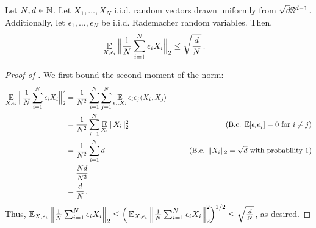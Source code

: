 \begin{lemma} \label{lemma:sign_times_gaussian_vector}
Let $N, d \in \mathbb{N}$. Let $X_1, \ldots, X_N$ i.i.d. random vectors drawn uniformly from $\sqrt{d} \mathbb{S}^{d - 1}$. Additionally, let $\epsilon_1, \ldots, \epsilon_N$ be i.i.d. Rademacher random variables. Then,
\begin{align}
\operatorname*{\mathbb{E}}_{X, \epsilon_i} \Big\| \frac{1}{N} \sum_{i = 1}^N \epsilon_i X_i \Big\|_2
& \leq \sqrt{\frac{d}{N}} \,.
\end{align}
\end{lemma}
\begin{proof}[Proof of ]
We first bound the second moment of the norm:
\begin{align}
\E_{X, \epsilon_i} \Big\|\frac{1}{N} \sum_{i = 1}^N \epsilon_i X_i \Big\|_2^2
& = \frac{1}{N^2} \sum_{i = 1}^N \sum_{j = 1}^N \E_{\epsilon_i, X_i} \epsilon_i \epsilon_j \langle X_i, X_j \rangle \\
& = \frac{1}{N^2} \sum_{i = 1}^N \E_{X_i} \|X_i\|_2^2 
& \tag{B.c. $\E[\epsilon_i \epsilon_j] = 0$ for $i \neq j$} \\
& = \frac{1}{N^2} \sum_{i = 1}^N d
& \tag{B.c. $\|X_i\|_2 = \sqrt{d}$ with probability $1$} \\
& = \frac{Nd}{N^2} \\
& = \frac{d}{N} \period
\end{align}
Thus, $\operatorname*{\mathbb{E}}_{X, \epsilon_i} \Big\| \frac{1}{N} \sum_{i = 1}^N \epsilon_i X_i \Big\|_2 \leq \Big(\operatorname*{\mathbb{E}}_{X, \epsilon_i} \Big\| \frac{1}{N} \sum_{i = 1}^N \epsilon_i X_i \Big\|_2^2 \Big)^{1/2} \leq \sqrt{\frac{d}{N}}$, as desired.
\end{proof}

